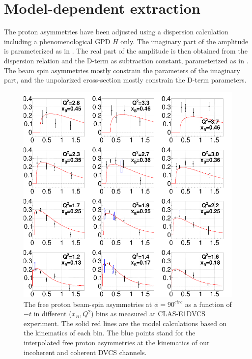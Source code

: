 \section{Model-dependent extraction}
The proton asymmetries have been adjusted using a dispersion calculation 
including a phenomenological GPD $H$ only. The imaginary part of the amplitude 
is parameterized as in \cite{GPD_cal_free_p}. The real part of the amplitude is 
then obtained from the dispersion relation and the D-term as subtraction 
constant, parameterized as in \cite{GPD_cal_free_p}. The beam spin asymmetries 
mostly constrain the parameters of the imaginary part, and the unpolarized 
cross-section mostly constrain the D-term parameters.

\begin{figure}[tpb]
   \centering
\includegraphics[scale=0.55]{fig_updated/From_FX_Check_Fit_6GeV_asym.png}
\caption{The free proton beam-spin asymmetries at $\phi = 90^{circ}$ as a 
function of $-t$ in different ($x_B, Q^2$) bins as measured at CLAS-E1DVCS 
experiment. The solid red lines are the model calculations based on the 
kinematics of each bin. The blue points stand for the interpolated free proton 
asymmetries at the kinematics of our incoherent and coherent DVCS channels.}
\label{fig:free-proton-alu}
\end{figure}









